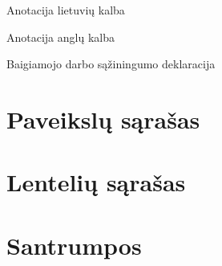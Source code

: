 \documentclass[12pt]{article}
\begin{document}
\begin{titlepage}
\centering

    {\Large Anotacija lietuvių kalba}

\end{titlepage}
\newpage


\begin{titlepage}
\centering

    {\Large Anotacija anglų kalba}

\end{titlepage}
\newpage


\begin{titlepage}
\centering

    {\Large Baigiamojo darbo sąžiningumo deklaracija}

\end{titlepage}
\newpage


    \tableofcontents

\newpage


\section*{Paveikslų sąrašas}


\newpage


\section*{Lentelių sąrašas}


\newpage


\section*{Santrumpos}
\end{document}
